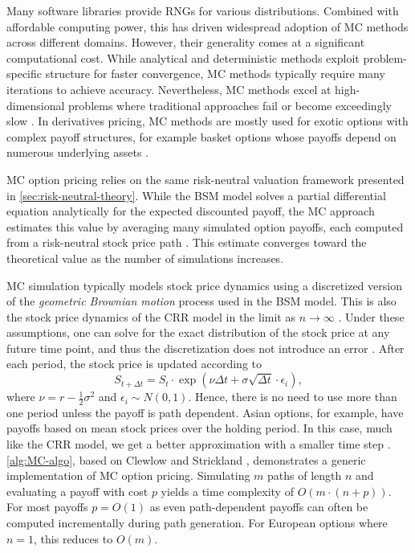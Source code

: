 \documentclass[english,12pt,a4paper,pdftex,sci,utf8]{aaltothesis}
\begin{document}
Many software libraries provide RNGs for various distributions. Combined with affordable computing power, this has driven widespread adoption of MC methods across different domains. However, their generality comes at a significant computational cost. While analytical and deterministic methods exploit problem-specific structure for faster convergence, MC methods typically require many iterations to achieve accuracy. Nevertheless, MC methods excel at high-dimensional problems where traditional approaches fail or become exceedingly slow \cite{gentle2003random}. In derivatives pricing, MC methods are mostly used for exotic options with complex payoff structures, for example basket options whose payoffs depend on numerous underlying assets \cite{hull2016options,wilmott2013paul}.

MC option pricing relies on the same risk-neutral valuation framework presented in \cref{sec:risk-neutral-theory}. While the BSM model solves a partial differential equation analytically for the expected discounted payoff, the MC approach estimates this value by averaging many simulated option payoffs, each computed from a risk-neutral stock price path \cite{boyle1977options}. This estimate converges toward the theoretical value as the number of simulations increases.

MC simulation typically models stock price dynamics using a discretized version of the \emph{geometric Brownian motion} process used in the BSM model. This is also the stock price dynamics of the CRR model in the limit as $n \rightarrow \infty$ \cite{cox1979option}. Under these assumptions, one can solve for the exact distribution of the stock price at any future time point, and thus the discretization does not introduce an error \cite{clewlow1998implementing}. After each period, the stock price is updated according to
\begin{equation*}
S_{t+\Delta t} = S_t \cdot \exp \left( \nu \Delta t + \sigma \sqrt{\Delta t} \cdot \epsilon_i \right),
\label{eq:GBM-price}
\end{equation*}
where $\nu=r-\frac{1}{2}\sigma^2$ and $\epsilon_i \sim N(0,1)$. Hence, there is no need to use more than one period unless the payoff is path dependent. Asian options, for example, have payoffs based on mean stock prices over the holding period. In this case, much like the CRR model, we get a better approximation with a smaller time step \cite{clewlow1998implementing}. \cref{alg:MC-algo}, based on Clewlow and Strickland \cite{clewlow1998implementing}, demonstrates a generic implementation of MC option pricing. Simulating $m$ paths of length $n$ and evaluating a payoff with cost $p$ yields a time complexity of $O(m \cdot (n+p))$. For most payoffs $p=O(1)$ as even path-dependent payoffs can often be computed incrementally during path generation. For European options where $n=1$, this reduces to $O(m)$.
\end{document}
